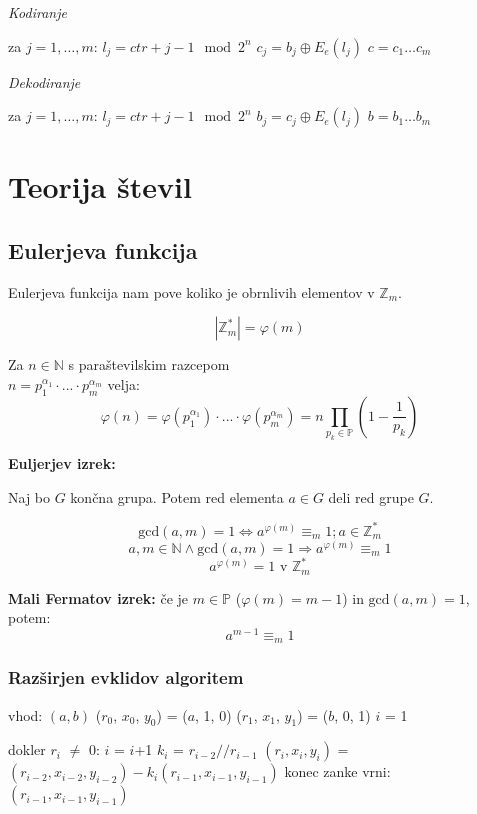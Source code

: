 \begin{multicols}{5}
\textit{Kodiranje}
\begin{koda}
za $ j = 1, \dots, m$:
	$l_j = ctr + j - 1 \mod 2^n$
	$c_j = b_j \oplus E_e(l_j)$
$c = c_1 \dots c_m$
\end{koda}

\textit{Dekodiranje}
\begin{koda}
za $ j = 1, \dots, m$:
	$l_j = ctr + j - 1 \mod 2^n$
	$b_j = c_j \oplus E_e(l_j)$
$b = b_1 \dots b_m$
\end{koda}

\section*{Teorija števil}

\subsection{Eulerjeva funkcija}
Eulerjeva funkcija nam pove koliko je obrnlivih elementov v $\mathbb{Z}_m$.

\[ | \mathbb{Z}_m^* | = \varphi(m) \]

Za $n \in \mathbb{N}$ s paraštevilskim razcepom \\ $ n = p_1^{\alpha_1} \cdot ... \cdot p_m^{\alpha_m}$ velja:
\[\varphi(n) = \varphi(p_1^{\alpha_1}) \cdot ... \cdot \varphi(p_m^{\alpha_m}) = n \prod_{ p_k \in \mathbb{P}} \left(1-\frac{1}{p_k} \right) \]

\textbf{Euljerjev izrek:}

Naj bo $G$ končna grupa. Potem red elementa $a \in G$ deli red grupe $G$.

\[\textrm{gcd}(a, m) = 1 \Leftrightarrow a^{\varphi(m)} \equiv_m 1; a \in \mathbb{Z}_m^*\]
\[a,m \in \mathbb{N} \wedge \textrm{gcd}(a, m) = 1 \Rightarrow a^{\varphi(m)} \equiv_m 1\]
\[a^{\varphi(m)} = 1 \text{ v } \mathbb{Z}_m^*\]

\textbf{Mali Fermatov izrek:} če je $m \in \mathbb{P}$ ($\varphi(m) = m-1$) in $\textrm{gcd}(a,m) = 1$, potem:
\[a^{m-1} \equiv_m 1\]

\subsubsection*{Razširjen evklidov algoritem}

\begin{koda}
vhod: $(a, b)$
($r_0$, $x_0$, $y_0$) = ($a$, 1, 0)
($r_1$, $x_1$, $y_1$) = ($b$, 0, 1)
$i$ = 1

dokler $r_i$ $\neq$ 0:
    $i$ = $i$+1
    $k_i$ = $r_{i-2} // r_{i-1}$
    $(r_i, x_i, y_i)$ = $(r_{i-2}, x_{i-2}, y_{i-2}) - k_i(r_{i-1}, x_{i-1}, y_{i-1})$
konec zanke
vrni: $(r_{i-1}, x_{i-1}, y_{i-1})$
\end{koda}


\end{multicols}
